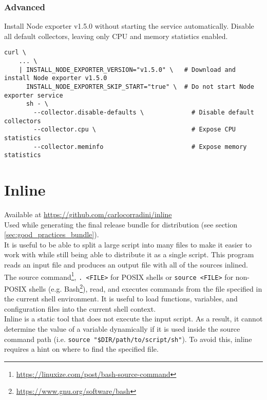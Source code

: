 \subsubsection{Advanced}
\label{subsubsec:corollary_projects_node_exporter_installer_example_advanced}

Install Node exporter v1.5.0 without starting the service automatically. Disable
all default collectors, leaving only CPU and memory statistics enabled.

\begin{lstlisting}[language=shell, alsoletter={-, .}, morekeywords={[3]{..., --collector.disable-defaults, --collector.cpu, --collector.meminfo, -}}, morekeywords={[4]{INSTALL_NODE_EXPORTER_VERSION, INSTALL_NODE_EXPORTER_SKIP_START}}, xleftmargin=\parindent, caption=Advanced installation with custom configuration parameters]
  curl \
    ... \
    | INSTALL_NODE_EXPORTER_VERSION="v1.5.0" \   # Download and install Node exporter v1.5.0
      INSTALL_NODE_EXPORTER_SKIP_START="true" \  # Do not start Node exporter service
      sh - \
        --collector.disable-defaults \             # Disable default collectors
        --collector.cpu \                          # Expose CPU statistics
        --collector.meminfo                        # Expose memory statistics
\end{lstlisting}

\section{Inline}
\label{sec:corollary_projects_inline}

Available at \url{https://github.com/carlocorradini/inline} \\ %
Used while generating the final release bundle for distribution (see section \ref{sec:good_practices_bundle}).
\\ %
It is useful to be able to split a large script into many files to make it
easier to work with while still being able to distribute it as a single script. This
program reads an input file and produces an output file with all of the sources inlined.
\\ %
The source command\footnote{\url{https://linuxize.com/post/bash-source-command}},
\texttt{.\ <FILE>} for POSIX shells or \texttt{source <FILE>} for non-POSIX
shells (e.g. Bash\footnote{\url{https://www.gnu.org/software/bash}}), read, and executes
commands from the file specified in the current shell environment. It is useful
to load functions, variables, and configuration files into the current shell
context. \\ %
Inline is a static tool that does not execute the input script. As a result, it
cannot determine the value of a variable dynamically if it is used inside the
source command path (i.e. \texttt{source "\$DIR/path/to/script/sh"}). To avoid
this, inline requires a hint on where to find the specified file.

